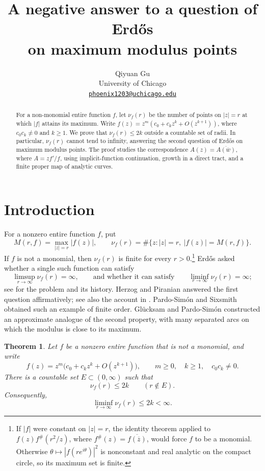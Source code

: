 \documentclass[11pt]{article}
\title{A negative answer to a question of Erd\H{o}s\\on maximum modulus points}
\author{Qiyuan Gu\\
University of Chicago\\
\href{mailto:phoenix1203@uchicago.edu}{\texttt{phoenix1203@uchicago.edu}}}
\date{}
\newtheorem{theorem}{Theorem}[section]
\theoremstyle{remark}
\numberwithin{equation}{section}
\begin{document}
\maketitle

\begin{abstract}
For a non-monomial entire function \(f\), let \(\nu_f(r)\) be the
number of points on \(|z|=r\) at which \(|f|\) attains its maximum.
Write \(f(z)=z^m(c_0+c_kz^k+O(z^{k+1}))\), where
\(c_0c_k\ne0\) and \(k\ge1\).
We prove that \(\nu_f(r)\le2k\) outside a countable set of radii.
In particular, \(\nu_f(r)\) cannot tend to infinity, answering the
second question of Erd\H{o}s on maximum modulus points.
The proof studies the correspondence
\(A(z)=\overline{A(\overline w)}\), where \(A=zf'/f\), using
implicit-function continuation, growth in a direct tract, and a finite
proper map of analytic curves.
\end{abstract}

\section{Introduction}

For a nonzero entire function \(f\), put
\[
 M(r,f)=\max_{|z|=r}|f(z)|,
 \qquad
 \nu_f(r)=\#\{z:|z|=r,\ |f(z)|=M(r,f)\}.
\]
If \(f\) is not a monomial, then \(\nu_f(r)\) is finite for every
\(r>0\).\footnote{If \(|f|\) were constant on \(|z|=r\), the identity
 theorem applied to \(f(z)f^\#(r^2/z)\), where
 \(f^\#(z)=\overline{f(\overline z)}\), would force \(f\) to be a
 monomial. Otherwise \(\theta\mapsto|f(re^{i\theta})|^2\) is nonconstant
 and real analytic on the compact circle, so its maximum set is finite.}
Erd\H{o}s asked whether a single such function can satisfy
\[
 \limsup_{r\to\infty}\nu_f(r)=\infty,
 \qquad\text{and whether it can satisfy}\qquad
 \liminf_{r\to\infty}\nu_f(r)=\infty;
\]
see \cite{Erdos1117,GP} for the problem and its history.
Herzog and Piranian \cite{HP} answered the first question affirmatively;
see also the account in \cite{GP}.
Pardo-Sim\'on and Sixsmith \cite{PS} obtained such an example of finite
order. Gl\"ucksam and Pardo-Sim\'on \cite{GP} constructed an approximate
analogue of the second property, with many separated arcs on which
the modulus is close to its maximum.

\begin{theorem}\label{thm:main}
Let \(f\) be a nonzero entire function that is not a monomial, and write
\begin{equation}\label{eq:taylor}
 f(z)=z^m\bigl(c_0+c_kz^k+O(z^{k+1})\bigr),
 \qquad m\ge0,\quad k\ge1,\quad c_0c_k\ne0.
\end{equation}
There is a countable set \(E\subset(0,\infty)\) such that
\begin{equation}\label{eq:main-bound}
 \nu_f(r)\le2k\qquad(r\notin E).
\end{equation}
Consequently,
\[
 \liminf_{r\to\infty}\nu_f(r)\le2k<\infty.
\]
\end{theorem}
\end{document}
